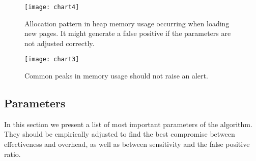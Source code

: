\documentclass[preprint, numbers]{sigplanconf}
\begin{document}
\begin{figure}
\centering
\texttt{[image: chart4]}
	\caption{Allocation pattern in heap memory usage occurring when loading new pages.
	It might generate a false positive if the parameters are not adjusted correctly.}
\label{fig:chart4}
\vspace{1.08cm}

\texttt{[image: chart3]}
	\caption{Common peaks in memory usage should not raise an alert.}
\label{fig:chart3}
\end{figure}

\subsection{Parameters}
\label{sec:params}

In this section we present a list of most important parameters of the algorithm.
They should be empirically adjusted to find the best compromise between
effectiveness and overhead, as well as between sensitivity and the false positive ratio.
\end{document}
